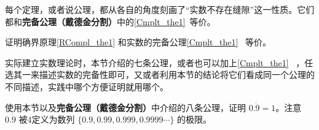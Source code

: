 每个定理，或者说公理，都从各自的角度刻画了“实数不存在缝隙”这一性质。它们都和\textbf{完备公理（戴德金分割）}中的\autoref{Cmplt_the1}~等价。

\begin{exercise}{}
证明确界原理\autoref{RCompl_the1} 和实数的完备公理\autoref{Cmplt_the1}~ 等价。
\end{exercise}

实际建立实数理论时，本节介绍的七条公理，或者也可以加上\autoref{Cmplt_the1}~ ，任选其一来描述实数的完备性即可，又或者利用本节的结论将它们看成同一个公理的不同描述，实践中哪个方便证明就用哪个。

\begin{exercise}{}
使用本节以及\textbf{完备公理（戴德金分割）}中介绍的八条公理，证明 $0.\dot{9}=1$。注意 $0.\dot{9}$ 被4定义为数列 $\{0.9, 0.99, 0.999, 0.9999\cdots\}$ 的极限。
\end{exercise}













